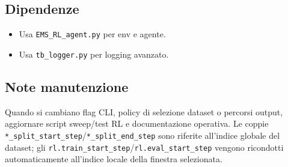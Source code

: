 \subsection*{Dipendenze}
\begin{itemize}[leftmargin=1.2cm]
\item Usa \texttt{EMS\_RL\_agent.py} per env e agente.
\item Usa \texttt{tb\_logger.py} per logging avanzato.
\end{itemize}

\subsection*{Note manutenzione}
Quando si cambiano flag CLI, policy di selezione dataset o percorsi output,
aggiornare script sweep/test RL e documentazione operativa.
Le coppie \texttt{*\_split\_start\_step}/\texttt{*\_split\_end\_step} sono riferite
all'indice globale del dataset; gli \texttt{rl.train\_start\_step}/\texttt{rl.eval\_start\_step}
vengono ricondotti automaticamente all'indice locale della finestra selezionata.
